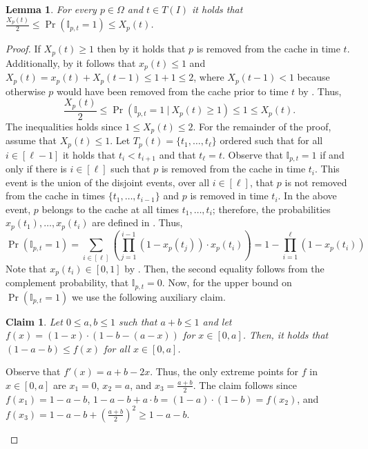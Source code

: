 \documentclass[11pt]{article}
\newcommand{\op}{{\mathbb{I}_{p,t}}}
\newcommand{\om}{{\Omega}}
\newtheorem{lemma}[thm]{Lemma}
\newtheorem{claim}[thm]{Claim}
\begin{document}
{	\begin{lemma}
	\label{lem:SAP}
	For every $p \in \om$ and $t \in T(I)$ it holds that $\frac{X_p(t)}{2}\leq \Pr \left(   \op = 1 \right) \leq X_p(t)$.
\end{lemma}

\begin{proof}
	If $X_p(t)\geq1$ then by  it holds that $p$ is removed from the cache in time $t$. Additionally, by  it follows that $x_p(t) \leq 1$ and $X_p(t) = x_p(t)+X_p(t-1) \leq 1+1 \leq 2$, where $X_p(t-1) < 1$ because otherwise $p$ would have been removed from the cache prior to time $t$ by . Thus, $$\frac{X_p(t)}{2} \leq \Pr \left(   \op = 1 ~|~ X_p(t)\geq1\right) \leq 1 \leq X_p(t).$$
	The inequalities holds since $1 \leq X_p(t)\leq 2$. For the remainder of the proof, assume that $X_p(t)\leq1$.  
	Let $T_p(t) = \{t_1,\ldots,t_{\ell}\}$ ordered such that for all $i \in [\ell-1]$ it holds that $t_{i}<t_{i+1}$ and that $t_{\ell} = t$. Observe that $\op = 1$ if and only if there is $i \in [\ell]$ such that $p$ is removed from the cache in time $t_i$. This event is the union of the disjoint events, over all $i \in [\ell]$, that $p$ is not removed from the cache in times $\{t_1,\ldots,t_{i-1}\}$ and $p$ is removed in time $t_i$. In the above event, $p$ belongs to the cache at all times $t_1,\ldots, t_i$; therefore, the probabilities $x_p(t_1),\ldots,x_p(t_i)$ are defined in . Thus, 
	\begin{equation}
		\label{eq:Nprob}
		\Pr \left(   \op = 1 \right) = \sum_{i \in [\ell]} \left( \prod_{j = 1}^{i-1} \left( 1- x_p(t_j) \right) \cdot x_p(t_i) \right) =  1- \prod_{i = 1}^{\ell} \left( 1-x_p(t_i) \right) 
	\end{equation} Note that $x_p(t_i) \in [0,1]$ by . Then, the second equality follows from the complement probability, that $\op = 0$. Now, for the upper bound on $	\Pr \left(   \op = 1 \right) $ we use the following auxiliary claim. 
		\begin{claim}	
			\label{clm:a}
			\label{claim:ab}
		Let  $0 \leq a,b \leq 1$ such that $a+b \leq 1$ and let $f(x) = (1-x) \cdot (1-b-(a-x))$ for $x \in [0,a]$. Then, it holds that $ (1-a-b) \leq f(x)$ for all $x \in [0,a]$.  
	\end{claim}
	\begin{claimproof}
		Observe that $f'(x) = a+b-2x$. Thus, the only extreme points for $f$ in $x \in[0,a]$ are $x_1 = 0$, $x_2 = a$, and $x_3  = \frac{a+b}{2}$. The claim follows since $f(x_1) = 1-a-b$, $1-a-b+a \cdot b = (1-a) \cdot (1-b) = f(x_2)$, and $f(x_3) = 1-a-b+\left(\frac{a+b}{2}\right)^2 \geq 1-a-b$. 
	\end{claimproof} 
	

\end{proof}}
\end{document}
